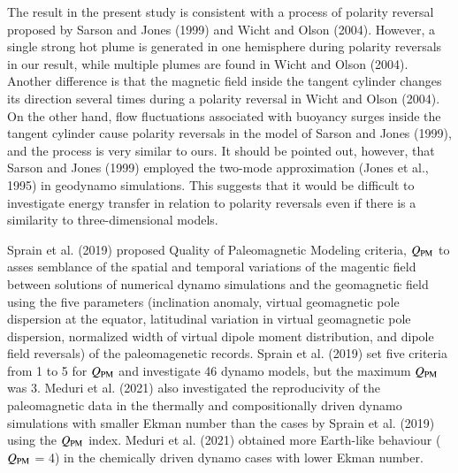 {\color{teal}
The result in the present study is consistent with a process of polarity reversal proposed by Sarson and Jones (1999) and Wicht and Olson (2004).
However, a single strong hot plume is generated in one hemisphere during polarity reversals in our result, while multiple plumes are found in Wicht and Olson (2004).
Another difference is that the magnetic field inside the tangent cylinder changes its direction several times during a polarity reversal in Wicht and Olson (2004).
On the other hand, flow fluctuations associated with buoyancy surges inside the tangent cylinder cause polarity reversals in the model of Sarson and Jones (1999), and the process is very similar to ours.
It should be pointed out, however, that Sarson and Jones (1999) employed the two-mode approximation (Jones et al., 1995) in geodynamo simulations.
This suggests that it would be difficult to investigate energy transfer in relation to polarity reversals even if there is a similarity to three-dimensional models.
}


{\color{red}
Sprain et al. (2019) proposed Quality of Paleomagnetic Modeling criteria, $Q_{\rm PM}$ to asses semblance of the spatial and temporal variations of the magentic field between solutions of numerical dynamo simulations and the geomagnetic field using the five parameters (inclination anomaly, virtual geomagnetic pole dispersion at the equator, latitudinal variation in virtual geomagnetic pole dispersion, normalized width of virtual dipole moment distribution, and dipole field reversals) of the paleomagenetic records. Sprain et al. (2019) set five criteria from 1 to 5 for $Q_{\rm PM}$ and investigate 46 dynamo models, but the maximum $Q_{\rm PM}$ was 3. Meduri et al. (2021) also investigated the reproducivity of the paleomagnetic data in the thermally and compositionally driven dynamo simulations with smaller Ekman number than the cases by Sprain et al. (2019) using the $Q_{\rm PM}$ index. Meduri et al. (2021) obtained more Earth-like behaviour ($Q_{\rm PM}$ = 4) in the chemically driven dynamo cases with lower Ekman number.
}

